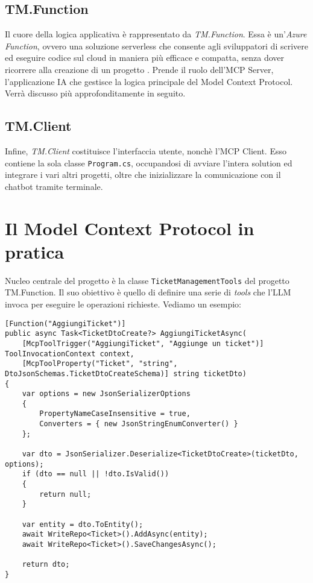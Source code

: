 \subsection{TM.Function}
Il cuore della logica applicativa è rappresentato da \textit{TM.Function}. Essa è un'\textit{Azure Function}, ovvero una soluzione serverless
che consente agli sviluppatori di scrivere ed eseguire codice sul cloud in maniera più efficace e compatta, senza dover ricorrere alla 
creazione di un progetto \cite{azurefunctions_msdocs}. Prende il ruolo dell'MCP Server, l'applicazione IA che gestisce la logica principale del
Model Context Protocol. Verrà discusso più approfonditamente in seguito.

\subsection{TM.Client}
Infine, \textit{TM.Client} costituisce l'interfaccia utente, nonchè l'MCP Client. Esso contiene la sola classe \texttt{Program.cs}, occupandosi
di avviare l'intera solution ed integrare i vari altri progetti, oltre che inizializzare la comunicazione con il chatbot tramite terminale.

\newpage
\section{Il Model Context Protocol in pratica}
Nucleo centrale del progetto è la classe \texttt{TicketManagementTools} del progetto TM.Function. Il suo obiettivo è quello di definire una serie
di \textit{tools} che l'LLM invoca per eseguire le operazioni richieste. Vediamo un esempio:

\begin{scriptsize}
\begin{verbatim}
[Function("AggiungiTicket")] 
public async Task<TicketDtoCreate?> AggiungiTicketAsync(
    [McpToolTrigger("AggiungiTicket", "Aggiunge un ticket")] ToolInvocationContext context,
    [McpToolProperty("Ticket", "string", DtoJsonSchemas.TicketDtoCreateSchema)] string ticketDto)
{
    var options = new JsonSerializerOptions
    {
        PropertyNameCaseInsensitive = true,
        Converters = { new JsonStringEnumConverter() }
    };

    var dto = JsonSerializer.Deserialize<TicketDtoCreate>(ticketDto, options);
    if (dto == null || !dto.IsValid())
    {
        return null;
    }

    var entity = dto.ToEntity();
    await WriteRepo<Ticket>().AddAsync(entity);
    await WriteRepo<Ticket>().SaveChangesAsync();

    return dto;
}
\end{verbatim}
\end{scriptsize}

